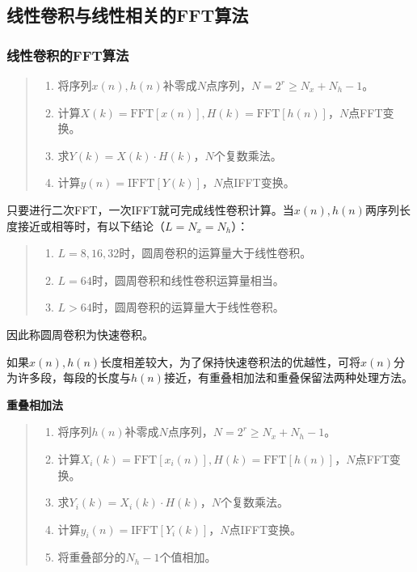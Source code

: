 \documentclass[cn, hazy, blue, normal, 14pt]{elegantnote}
\begin{document}
\subsection{线性卷积与线性相关的FFT算法}

\subsubsection{线性卷积的FFT算法}

\begin{quote}
\begin{enumerate}
    \item 将序列$x(n), h(n)$补零成$N$点序列，$N=2^r\geq N_x+N_h-1$。
    \item 计算$X(k)=\text{FFT}[x(n)], H(k)=\text{FFT}[h(n)]$，$N$点FFT变换。
    \item 求$Y(k)=X(k)\cdot H(k)$，$N$个复数乘法。
    \item 计算$y(n)=\text{IFFT}[Y(k)]$，$N$点IFFT变换。
\end{enumerate}
\end{quote}

只要进行二次FFT，一次IFFT就可完成线性卷积计算。当$x(n), h(n)$两序列长度接近或相等时，有以下结论（$L=N_x=N_h$）：

\begin{quote}
\begin{enumerate}
    \item $L=8, 16, 32$时，圆周卷积的运算量大于线性卷积。
    \item $L=64$时，圆周卷积和线性卷积运算量相当。
    \item $L>64$时，圆周卷积的运算量大于线性卷积。
\end{enumerate}
\end{quote}

因此称圆周卷积为快速卷积。

如果$x(n), h(n)$长度相差较大，为了保持快速卷积法的优越性，可将$x(n)$分为许多段，每段的长度与$h(n)$接近，有重叠相加法和重叠保留法两种处理方法。

\textbf{重叠相加法}

\begin{quote}
\begin{enumerate}
    \item 将序列$h(n)$补零成$N$点序列，$N=2^r\geq N_x+N_h-1$。
    \item 计算$X_i(k)=\text{FFT}[x_i(n)], H(k)=\text{FFT}[h(n)]$，$N$点FFT变换。
    \item 求$Y_i(k)=X_i(k)\cdot H(k)$，$N$个复数乘法。
    \item 计算$y_i(n)=\text{IFFT}[Y_i(k)]$，$N$点IFFT变换。
    \item 将重叠部分的$N_h-1$个值相加。
\end{enumerate}
\end{quote}
\end{document}
